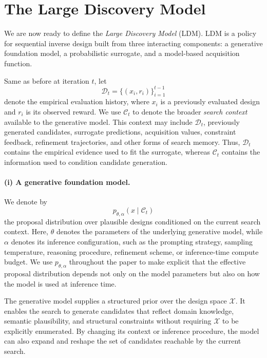 \section{The Large Discovery Model}
\label{sec:method}

We are now ready to define the \emph{Large Discovery Model} (LDM). LDM is a
policy for sequential inverse design built from three interacting components:
a generative foundation model, a probabilistic surrogate, and a model-based
acquisition function.

Same as before at iteration $t$, let
\[
\mathcal{D}_t=\{(x_i,r_i)\}_{i=1}^{t-1}
\]
denote the empirical evaluation history, where $x_i$ is a previously evaluated
design and $r_i$ is its observed reward. We use $\mathcal{C}_t$ to denote the
broader \emph{search context} available to the generative model. This context
may include $\mathcal{D}_t$, previously generated candidates, surrogate
predictions, acquisition values, constraint feedback, refinement trajectories,
and other forms of search memory. Thus, $\mathcal{D}_t$ contains the empirical
evidence used to fit the surrogate, whereas $\mathcal{C}_t$ contains the
information used to condition candidate generation.

\paragraph{(i) A generative foundation model.}
We denote by
\begin{equation}
    p_{\theta,\alpha}(x\mid\mathcal{C}_t)
\end{equation}
the proposal distribution over plausible designs conditioned on the current
search context. Here, $\theta$ denotes the parameters of the underlying
generative model, while $\alpha$ denotes its inference configuration, such as
the prompting strategy, sampling temperature, reasoning procedure, refinement
scheme, or inference-time compute budget. We use $p_{\theta,\alpha}$ throughout
the paper to make explicit that the effective proposal distribution depends
not only on the model parameters but also on how the model is used at
inference time.

The generative model supplies a structured prior over the design space
$\mathcal{X}$. It enables the search to generate candidates that reflect
domain knowledge, semantic plausibility, and structural constraints without
requiring $\mathcal{X}$ to be explicitly enumerated. By changing its context
or inference procedure, the model can also expand and reshape the set of
candidates reachable by the current search.

